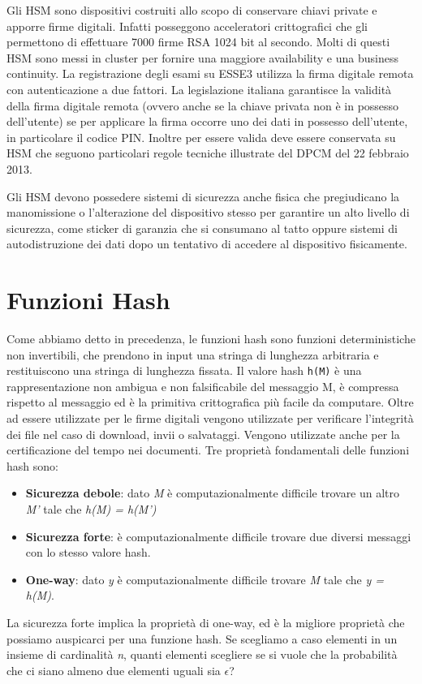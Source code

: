 \vspace{5mm}

Gli HSM sono dispositivi costruiti allo scopo di conservare chiavi private e apporre firme digitali. Infatti posseggono acceleratori crittografici che gli permettono di effettuare 7000 firme RSA 1024 bit al secondo. Molti di questi HSM sono messi in cluster per fornire una maggiore availability e una business continuity. La registrazione degli esami su ESSE3 utilizza la firma digitale remota con autenticazione a due fattori. La legislazione italiana garantisce la validità della firma digitale remota (ovvero anche se la chiave privata non è in possesso dell'utente) se per applicare la firma occorre uno dei dati in possesso dell'utente, in particolare il codice PIN. Inoltre per essere valida deve essere conservata su HSM che seguono particolari regole tecniche illustrate del DPCM del 22 febbraio 2013. 

Gli HSM devono possedere sistemi di sicurezza anche fisica che pregiudicano la manomissione o l'alterazione del dispositivo stesso per garantire un alto livello di sicurezza, come sticker di garanzia che si consumano al tatto oppure sistemi di autodistruzione dei dati dopo un tentativo di accedere al dispositivo fisicamente. 
 
\section{Funzioni Hash}
Come abbiamo detto in precedenza, le funzioni hash sono funzioni deterministiche non invertibili, che prendono in input una stringa di lunghezza arbitraria e restituiscono una stringa di lunghezza fissata. Il valore hash \texttt{h(M)} è una rappresentazione non ambigua e non falsificabile del messaggio M, è compressa rispetto al messaggio ed è la primitiva crittografica più facile da computare. 
Oltre ad essere utilizzate per le firme digitali vengono utilizzate per verificare l'integrità dei file nel caso di download, invii o salvataggi. Vengono utilizzate anche per la certificazione del tempo nei documenti. Tre proprietà fondamentali delle funzioni hash sono:
\begin{itemize}
    \item \textbf{Sicurezza debole}: dato \textit{M} è computazionalmente difficile trovare un altro \textit{M'} tale che \textit{h(M) = h(M')}
    \item \textbf{Sicurezza forte}: è computazionalmente difficile trovare due diversi messaggi con lo stesso valore hash.
    \item \textbf{One-way}: dato \textit{y} è computazionalmente difficile trovare \textit{M} tale che \textit{y = h(M)}.
\end{itemize}
La sicurezza forte implica la proprietà di one-way, ed è la migliore proprietà che possiamo auspicarci per una funzione hash. Se scegliamo a caso elementi in un insieme di cardinalità \textit{n}, quanti elementi scegliere se si vuole che la probabilità che ci siano almeno due elementi uguali sia $\epsilon$?

